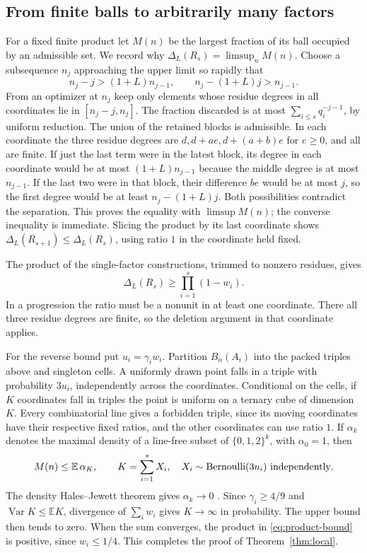 \subsection{From finite balls to arbitrarily many factors}
For a fixed finite product let $M(n)$ be the largest fraction of its ball occupied by an admissible set. We record why $\Delta_L(R_s)=\limsup_n M(n)$. Choose a subsequence $n_j$ approaching the upper limit so rapidly that
\[
      n_j-j>(1+L)n_{j-1},\qquad n_j-(1+L)j>n_{j-1}.
\]
From an optimizer at $n_j$ keep only elements whose residue degrees in all coordinates lie in $[n_j-j,n_j]$. The fraction discarded is at most $\sum_{i\le s}q_i^{-j-1}$, by uniform reduction. The union of the retained blocks is admissible. In each coordinate the three residue degrees are $d,d+ae,d+(a+b)e$ for $e\ge0$, and all are finite. If just the last term were in the latest block, its degree in each coordinate would be at most $(1+L)n_{j-1}$ because the middle degree is at most $n_{j-1}$. If the last two were in that block, their difference $be$ would be at most $j$, so the first degree would be at least $n_j-(1+L)j$. Both possibilities contradict the separation. This proves the equality with $\limsup M(n)$; the converse inequality is immediate. Slicing the product by its last coordinate shows $\Delta_L(R_{s+1})\le\Delta_L(R_s)$, using ratio $1$ in the coordinate held fixed.

The product of the single-factor constructions, trimmed to nonzero residues, gives
\begin{equation}\label{eq:product-bound}
                    \Delta_L(R_s)\ge \prod_{i=1}^s(1-w_i).
\end{equation}
In a progression the ratio must be a nonunit in at least one coordinate. There all three residue degrees are finite, so the deletion argument in that coordinate applies.

For the reverse bound put $u_i=\gamma_i w_i$. Partition $B_n(A_i)$ into the packed triples above and singleton cells. A uniformly drawn point falls in a triple with probability $3u_i$, independently across the coordinates. Conditional on the cells, if $K$ coordinates fall in triples the point is uniform on a ternary cube of dimension $K$. Every combinatorial line gives a forbidden triple, since its moving coordinates have their respective fixed ratios, and the other coordinates can use ratio $1$. If $\alpha_k$ denotes the maximal density of a line-free subset of $\{0,1,2\}^k$, with $\alpha_0=1$, then
\[
          M(n)\le \mathbb E\,\alpha_K,\qquad
          K=\sum_{i=1}^s X_i,\quad X_i\sim{\rm Bernoulli}(3u_i)
          \ \text{independently}.
\]
The density Hales--Jewett theorem gives $\alpha_k\to0$ \cite{dhj}. Since $\gamma_i\ge4/9$ and $\operatorname{Var}K\le\mathbb EK$, divergence of $\sum_iw_i$ gives $K\to\infty$ in probability. The upper bound then tends to zero. When the sum converges, the product in \eqref{eq:product-bound} is positive, since $w_i\le1/4$. This completes the proof of Theorem~\ref{thm:local}.

